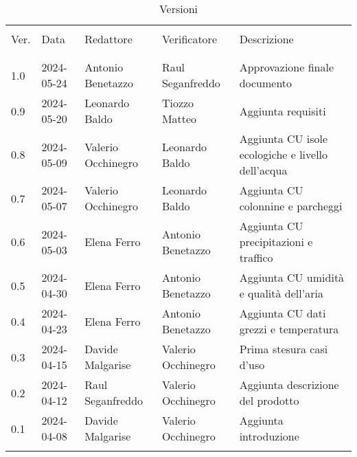 \documentclass[12pt]{article}
\begin{document}


\newpage



\captionsetup[table]{list=no}
\begin{table}[!h]
	\footnotesize
	\begin{center}
		\caption*{Versioni}
		\vspace{0.5cm}
		\begin{tabular}{ l l l l p{6.1cm} }
			\hline                                                                                                          \\[-2ex]
			Ver. & Data & Redattore & Verificatore & Descrizione\\
			\\[-2ex] \hline \\[-1.5ex]
			1.0 & 2024-05-24 & Antonio Benetazzo & Raul Seganfreddo & Approvazione finale documento\\
			0.9 & 2024-05-20 & Leonardo Baldo & Tiozzo Matteo & Aggiunta requisiti\\
			0.8 & 2024-05-09 & Valerio Occhinegro & Leonardo Baldo & Aggiunta CU isole ecologiche e livello dell'acqua \\
			0.7 & 2024-05-07 & Valerio Occhinegro & Leonardo Baldo & Aggiunta CU colonnine e parcheggi\\
			0.6 & 2024-05-03 & Elena Ferro & Antonio Benetazzo & Aggiunta CU precipitazioni e traffico\\
			0.5 & 2024-04-30 & Elena Ferro & Antonio Benetazzo & Aggiunta CU umidità e qualità dell'aria\\
			0.4 & 2024-04-23 & Elena Ferro & Antonio Benetazzo & Aggiunta CU dati grezzi e temperatura\\
			0.3 & 2024-04-15 & Davide Malgarise & Valerio Occhinegro & Prima stesura casi d'uso\\
			0.2 & 2024-04-12 & Raul Seganfreddo & Valerio Occhinegro & Aggiunta descrizione del prodotto \\
			0.1 & 2024-04-08 & Davide Malgarise & Valerio Occhinegro & Aggiunta introduzione \\
			\\[-1.5ex] \hline
		\end{tabular}
	\end{center}
\end{table}
\captionsetup[table]{list=yes}

\newpage

\tableofcontents
\listoftables
\listoffigures

\newpage








\end{document}
